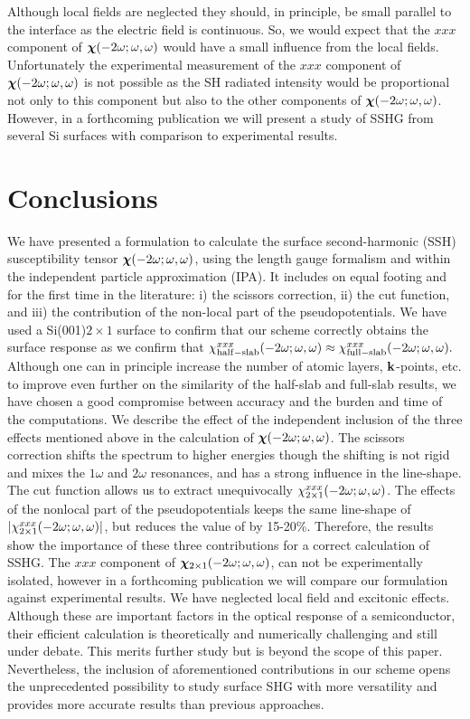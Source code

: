 \documentclass[floatfix,prb,aps,superscriptaddress,11pt,preprint,letterpaper]{revtex4}
\begin{document}
Although local fields are neglected they should, in principle, 
be small parallel to the interface as the electric field is continuous.
So, we would expect that the $xxx$ component of 
$\boldsymbol{\chi}(-2\omega;\omega,\omega)$ would have a small influence from the local fields.
Unfortunately the experimental measurement of the $xxx$
component of $\boldsymbol{\chi}(-2\omega;\omega,\omega)$ is not possible as the SH 
radiated intensity would be proportional not only to this component 
but also to the other components of $\boldsymbol{\chi}(-2\omega;\omega,\omega)$.  
However,
in a forthcoming publication 
we will present a study of SSHG from several 
Si surfaces 
with comparison to experimental 
results. 

\section{Conclusions}\label{conc}

We have presented a formulation to calculate the surface second-harmonic
(SSH) susceptibility tensor $\boldsymbol{\chi}(-2\omega;\omega,\omega)$, using the length gauge
formalism and within the independent particle approximation (IPA).
It includes on equal footing and for the first time in the literature: 
i) the scissors correction, ii) the cut function, and iii) the
contribution of the non-local part of the pseudopotentials.
We have used a Si(001)$2\times 1$ surface to confirm that our scheme
correctly obtains the surface response as we confirm
that 
$\chi_{\mathrm{half-slab}}^{xxx}(-2\omega;\omega,\omega) 
\approx
\chi_{\mathrm{full-slab}}^{xxx}(-2\omega;\omega,\omega) 
. 
$
Although one can in principle increase the number of atomic layers,
$\mathbf{k}$-points, etc. to
improve even further on the similarity of the half-slab and full-slab results, we
have chosen a good compromise between accuracy and the burden and time
of the computations. 
We describe the effect of the independent inclusion of the three
effects mentioned above in the calculation of  
$\boldsymbol{\chi}(-2\omega;\omega,\omega)$. 
The scissors correction shifts the spectrum to  
higher energies though the shifting is not rigid and mixes the 
$1\omega$ and $2\omega$ resonances,  
and has a strong influence in the line-shape.
 The cut function allows us  
to extract unequivocally $\chi^{xxx}_{2\times 1}(-2\omega;\omega,\omega)$.
 The effects of the nonlocal part of the pseudopotentials  
keeps the same line-shape of $|\chi^{xxx}_{2\times
  1}(-2\omega;\omega,\omega)|$,
but  
reduces the value of   
by 15-20\%. 
Therefore,  
the results show the importance of these three contributions for a correct calculation 
of SSHG.
The $xxx$ component of  
$\boldsymbol{\chi}_{2\times 1}(-2\omega;\omega,\omega)$, 
can not be
experimentally isolated,
however in a forthcoming publication 
we will compare our formulation 
against
experimental 
results. 
We have neglected
local field 
and excitonic effects.
Although these are important factors in the optical response of a semiconductor,
their efficient calculation is theoretically and 
numerically challenging and still 
under debate.\cite{beyond}  
This merits further study but is beyond the scope of this paper. 
Nevertheless, the inclusion of aforementioned contributions 
in
our scheme opens the unprecedented possibility to study 
surface SHG with more versatility and provides 
more accurate results than previous approaches. 
\end{document}
